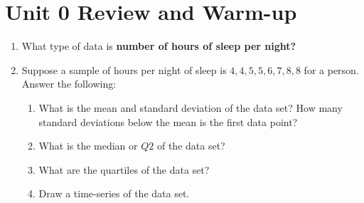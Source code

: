 \documentclass{article}
\begin{document}
\section{Unit 0 Review and Warm-up}

\begin{enumerate}
\item What type of data is \textbf{number of hours of sleep per night?}
\item Suppose a sample of hours per night of sleep is ${4,4,5,5,6,7,8,8}$ for a person.  Answer the following:
\begin{enumerate}
\item What is the mean and standard deviation of the data set? How many standard deviations below the mean is the first data point? \\ \vspace{0.33cm}
\item What is the median or $Q2$ of the data set? \\ \vspace{0.33cm}
\item What are the quartiles of the data set? \\ \vspace{0.33cm}
\item Draw a time-series of the data set.
\end{enumerate}
\end{enumerate}
\end{document}
